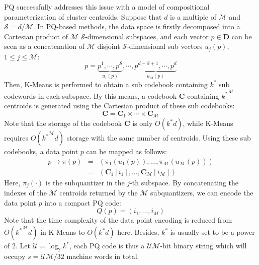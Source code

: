 \documentclass[twocolumn]{svjour3}          %
\begin{document}
PQ successfully addresses this issue with a model of compositional parameterization of cluster centroids. Suppose that $d$ is a multiple of $\mathcal{M}$ and $\mathcal{S}=d/\mathcal{M}$. In PQ-based methods, the data space is firstly decomposed into a Cartesian product of $\mathcal{M}$ $\mathcal{S}$-dimensional subspaces, and each vector $p\in \textbf{D}$ can be seen as a concatenation of $\mathcal{M}$ disjoint $\mathcal{S}$-dimensional sub vectors $u_j(p)$, $1\le j \le \mathcal{M}$:
$$
p = \underbrace {{p^1}, \cdots ,{p^\mathcal{S}}}_{{u_1}\left( p \right)}, \cdots ,\underbrace {{p^{d - \mathcal{S} + 1}}, \cdots ,{p^d}}_{{u_{M}\left( p \right)}}
$$
Then, K-Means is performed to obtain a sub codebook containing $k^*$ sub codewords in each subspace. By this means, a codebook $\textbf{C}$ containing ${k^*}^\mathcal{M}$ centroids is generated using the Cartesian product of these sub codebooks:
$$
\textbf{C}=\textbf{C}_1 \times \cdots \times \textbf{C}_{\mathcal{M}}
$$
Note that the storage of the codebook $\textbf{C}$ is only $O(k^* d)$, while K-Means requires $O({k^*}^\mathcal{M}d)$ storage with the same number of centroids. Using these sub codebooks, a data point $p$ can be mapped as follows:
$$
\begin{array}{*{20}{l}}
{p \to \pi \left( p \right)}& = &{\left( {{\pi _1}\left( {{u_1}\left( p \right)} \right), \ldots ,{\pi _\mathcal{M}}\left( {{u_\mathcal{M}}\left( p \right)} \right)} \right)}\\
{}& = &{\left( {{\textbf{C}_1}[{i_1}], \ldots ,{\textbf{C}_\mathcal{M}}[{i_\mathcal{M}}]} \right)}
\end{array}
$$
Here, $\pi_j(\cdot)$ is the subquantizer in the $j$-th subspace. By concatenating the indexes of the $\mathcal{M}$ centroids returned by the $\mathcal{M}$ subquantizers, we can encode the data point $p$ into a compact PQ code:
$$
Q\left( p \right) = \left( {{i_1}, \ldots ,{i_M}} \right)
$$
Note that the time complexity of the data point encoding is reduced from $O({k^*}^\mathcal{M}d)$ in K-Means to $O(k^* d)$ here. Besides, $k^*$ is usually set to be a power of 2. Let $\mathcal{U}=\log_2k^*$, each PQ code is thus a $\mathcal{UM}$-bit binary string which will occupy $s=\mathcal{UM}/32$ machine words in total.
\end{document}
